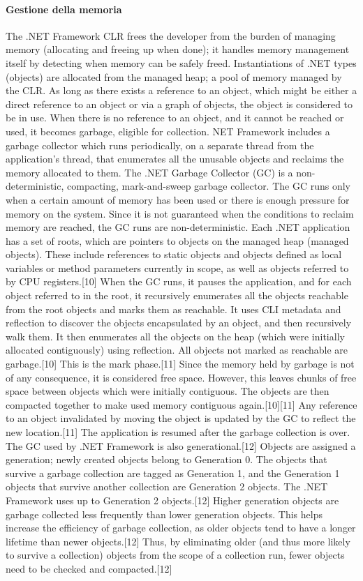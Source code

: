 \paragraph{Gestione della memoria}
The .NET Framework CLR frees the developer from the burden of managing memory (allocating and freeing up when done); it handles memory management itself by detecting when memory can be safely freed. Instantiations of .NET types (objects) are allocated from the managed heap; a pool of memory managed by the CLR. As long as there exists a reference to an object, which might be either a direct reference to an object or via a graph of objects, the object is considered to be in use. When there is no reference to an object, and it cannot be reached or used, it becomes garbage, eligible for collection. NET Framework includes a garbage collector which runs periodically, on a separate thread from the application's thread, that enumerates all the unusable objects and reclaims the memory allocated to them.
The .NET Garbage Collector (GC) is a non-deterministic, compacting, mark-and-sweep garbage collector. The GC runs only when a certain amount of memory has been used or there is enough pressure for memory on the system. Since it is not guaranteed when the conditions to reclaim memory are reached, the GC runs are non-deterministic. Each .NET application has a set of roots, which are pointers to objects on the managed heap (managed objects). These include references to static objects and objects defined as local variables or method parameters currently in scope, as well as objects referred to by CPU registers.[10] When the GC runs, it pauses the application, and for each object referred to in the root, it recursively enumerates all the objects reachable from the root objects and marks them as reachable. It uses CLI metadata and reflection to discover the objects encapsulated by an object, and then recursively walk them. It then enumerates all the objects on the heap (which were initially allocated contiguously) using reflection. All objects not marked as reachable are garbage.[10] This is the mark phase.[11] Since the memory held by garbage is not of any consequence, it is considered free space. However, this leaves chunks of free space between objects which were initially contiguous. The objects are then compacted together to make used memory contiguous again.[10][11] Any reference to an object invalidated by moving the object is updated by the GC to reflect the new location.[11] The application is resumed after the garbage collection is over.
The GC used by .NET Framework is also generational.[12] Objects are assigned a generation; newly created objects belong to Generation 0. The objects that survive a garbage collection are tagged as Generation 1, and the Generation 1 objects that survive another collection are Generation 2 objects. The .NET Framework uses up to Generation 2 objects.[12] Higher generation objects are garbage collected less frequently than lower generation objects. This helps increase the efficiency of garbage collection, as older objects tend to have a longer lifetime than newer objects.[12] Thus, by eliminating older (and thus more likely to survive a collection) objects from the scope of a collection run, fewer objects need to be checked and compacted.[12]
